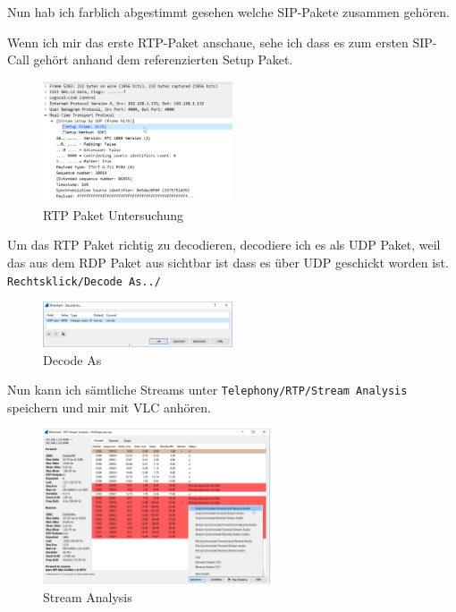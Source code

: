 \documentclass[12pt,a4paper,titlepage,oneside]{scrartcl}
\begin{document}
Nun hab ich farblich abgestimmt gesehen welche SIP-Pakete zusammen gehören.

Wenn ich mir das erste RTP-Paket anschaue, sehe ich dass es zum ersten SIP-Call gehört anhand dem referenzierten Setup Paket.

\begin{figure}[h!]
  \centering
    \includegraphics[width=0.5\textwidth]{./imgs/intranet_screenshots/ws_rtppaket.png}
  \caption{RTP Paket Untersuchung}
  \label{fig:rtppacket}
\end{figure}

Um das RTP Paket richtig zu decodieren, decodiere ich es als UDP Paket, weil das aus dem RDP Paket aus sichtbar ist dass es über UDP geschickt worden ist. \lstinline{Rechtsklick/Decode As../}

\begin{figure}[h!]
  \centering
    \includegraphics[width=0.5\textwidth]{./imgs/intranet_screenshots/ws_decodeas.png}
  \caption{Decode As}
  \label{fig:decodeas}
\end{figure}

Nun kann ich sämtliche Streams unter \lstinline{Telephony/RTP/Stream Analysis} speichern und mir mit VLC anhören.

\begin{figure}[h!]
  \centering
    \includegraphics[width=0.6\textwidth]{./imgs/intranet_screenshots/ws_streamanalysis.png}
  \caption{Stream Analysis}
  \label{fig:rtppacket}
\end{figure}
\end{document}
